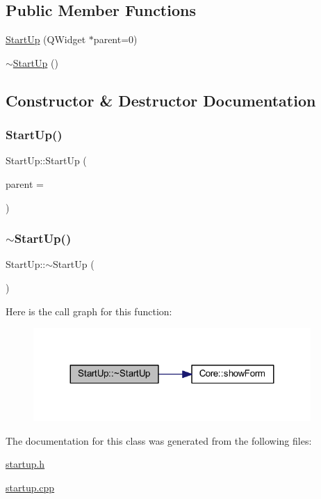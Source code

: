 \subsection*{Public Member Functions}
\begin{DoxyCompactItemize}
\item 
\hyperlink{class_start_up_a8df20d71c2bed10b67875067eb8d67a4}{Start\+Up} (Q\+Widget $\ast$parent=0)
\item 
\hyperlink{class_start_up_aec41633191799fe596459a1a47fe03c3}{$\sim$\+Start\+Up} ()
\end{DoxyCompactItemize}


\subsection{Constructor \& Destructor Documentation}
\hypertarget{class_start_up_a8df20d71c2bed10b67875067eb8d67a4}{}\label{class_start_up_a8df20d71c2bed10b67875067eb8d67a4} 
\subsubsection{\texorpdfstring{Start\+Up()}{StartUp()}}
{\footnotesize\ttfamily Start\+Up\+::\+Start\+Up (\begin{DoxyParamCaption}\item[{Q\+Widget $\ast$}]{parent = {} }\end{DoxyParamCaption})\hspace{0.3cm}{\ttfamily [explicit]}}

\hypertarget{class_start_up_aec41633191799fe596459a1a47fe03c3}{}\label{class_start_up_aec41633191799fe596459a1a47fe03c3} 
\subsubsection{\texorpdfstring{$\sim$\+Start\+Up()}{~StartUp()}}
{\footnotesize\ttfamily Start\+Up\+::$\sim$\+Start\+Up (\begin{DoxyParamCaption}{ }\end{DoxyParamCaption})}

Here is the call graph for this function\+:
\nopagebreak
\begin{figure}[H]
\begin{center}
\leavevmode
\includegraphics[width=299pt]{class_start_up_aec41633191799fe596459a1a47fe03c3_cgraph}
\end{center}
\end{figure}


The documentation for this class was generated from the following files\+:\begin{DoxyCompactItemize}
\item 
\hyperlink{startup_8h}{startup.\+h}\item 
\hyperlink{startup_8cpp}{startup.\+cpp}\end{DoxyCompactItemize}
